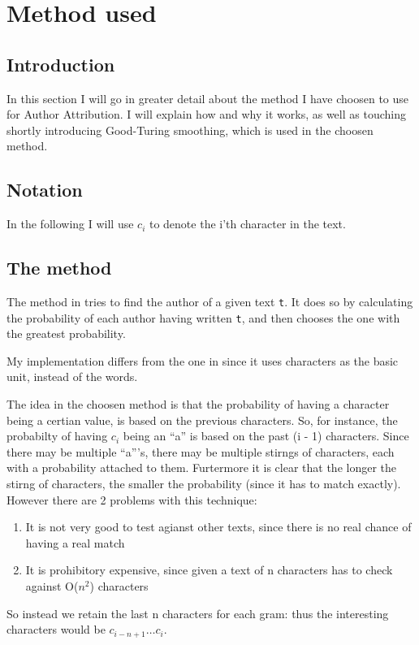 \section{Method used}
\label{method}

\subsection{Introduction}
In this section I will go in greater detail about the method I have choosen to use for Author Attribution. I will explain how and why it works, as well as touching shortly introducing Good-Turing smoothing, which is used in the choosen method.

\subsection{Notation}
In the following I will use $c_i$ to denote the i'th character in the text.

\subsection{The method}
The method in \cite{nr4} tries to find the author of a given text \texttt{t}. It does so by calculating the probability of each author having written \texttt{t}, and then chooses the one with the greatest probability.

My implementation differs from the one in \cite{nr4} since it uses characters as the basic unit, instead of the words. 

The idea in the choosen method is that the probability of having a character being a certian value, is based on the previous characters. So, for instance, the probabilty of having $c_i$ being an ``a'' is based on the past (i - 1) characters. Since there may be multiple ``a'''s, there may be multiple stirngs of characters, each with a probability attached to them. Furtermore it is clear that the longer the stirng of characters, the smaller the probability (since it has to match exactly). However there are 2 problems with this technique:
\begin{enumerate}
\item It is not very good to test agianst other texts, since there is no real chance of having a real match
\item It is prohibitory expensive, since given a text of n characters has to check against O($n^2$) characters  
\end{enumerate}
So instead we retain the last n characters for each gram: thus the interesting characters would be $c_{i - n + 1} \ldots c_{i}$.\\

